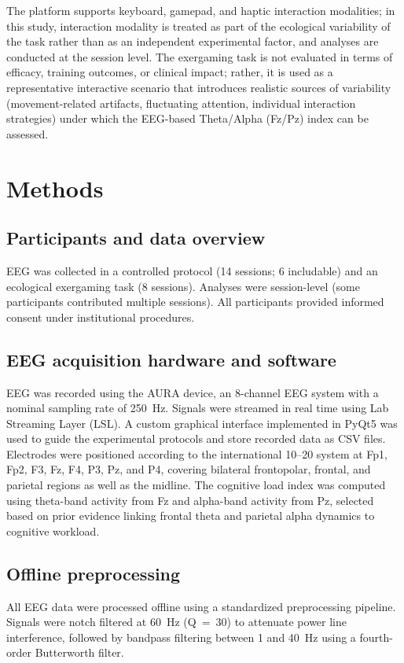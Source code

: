\documentclass[conference]{IEEEtran}
\begin{document}
The platform supports keyboard, gamepad, and haptic interaction modalities; in this study, interaction modality is treated as part of the ecological variability of the task rather than as an independent experimental factor, and analyses are conducted at the session level. The exergaming task is not evaluated in terms of efficacy, training outcomes, or clinical impact; rather, it is used as a representative interactive scenario that introduces realistic sources of variability (movement-related artifacts, fluctuating attention, individual interaction strategies) under which the EEG-based Theta/Alpha (Fz/Pz) index can be assessed.



\section{Methods}

\subsection{Participants and data overview}
EEG was collected in a controlled protocol (14 sessions; 6 includable) and an ecological exergaming task (8 sessions). Analyses were session-level (some participants contributed multiple sessions). All participants provided informed consent under institutional procedures.

\subsection{EEG acquisition hardware and software}
EEG was recorded using the AURA device, an 8-channel EEG system with a nominal sampling rate of 250~Hz. Signals were streamed in real time using Lab Streaming Layer (LSL). A custom graphical interface implemented in PyQt5 was used to guide the experimental protocols and store recorded data as CSV files. Electrodes were positioned according to the international 10--20 system at Fp1, Fp2, F3, Fz, F4, P3, Pz, and P4, covering bilateral frontopolar, frontal, and parietal regions as well as the midline. The cognitive load index was computed using theta-band activity from Fz and alpha-band activity from Pz, selected based on prior evidence linking frontal theta and parietal alpha dynamics to cognitive workload.

\subsection{Offline preprocessing}
All EEG data were processed offline using a standardized preprocessing pipeline. Signals were notch filtered at 60~Hz (Q~=~30) to attenuate power line interference, followed by bandpass filtering between 1 and 40~Hz using a fourth-order Butterworth filter.
\end{document}
